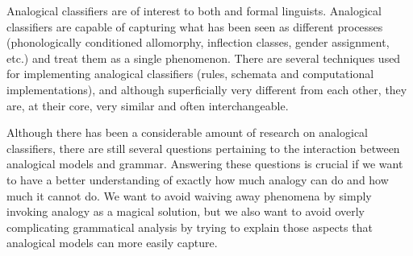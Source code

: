 Analogical classifiers are of interest to both  and formal linguists. Analogical classifiers are capable of capturing what has been seen as different processes (phonologically conditioned allomorphy, inflection classes, gender assignment, etc.) and treat them as a single phenomenon. There are several techniques used for implementing analogical classifiers (rules, schemata and computational implementations), and although superficially very different from each other, they are, at their core, very similar and often interchangeable.

Although there has been a considerable amount of research on analogical classifiers, there are still several questions pertaining to the interaction between analogical models and grammar. Answering these questions is crucial if we want to have a better understanding of exactly how much analogy can do and how much it cannot do. We want to avoid waiving away phenomena by simply invoking analogy as a magical solution, but we also want to avoid overly complicating grammatical analysis by trying to explain those aspects that analogical models can more easily capture.

